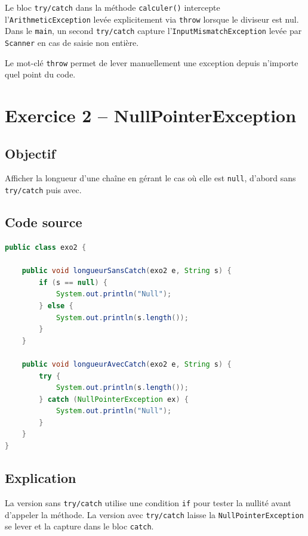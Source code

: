 Le bloc \texttt{try/catch} dans la méthode \texttt{calculer()} intercepte
l'\texttt{ArithmeticException} levée explicitement via \texttt{throw} lorsque
le diviseur est nul. Dans le \texttt{main}, un second \texttt{try/catch}
capture l'\texttt{InputMismatchException} levée par \texttt{Scanner} en cas de
saisie non entière.

\begin{infobox}
    \centering\vspace{0.2cm}
    {\large Le mot-clé \texttt{throw} permet de lever manuellement une exception
    depuis n'importe quel point du code.}
    \vspace{0.2cm}
\end{infobox}

\section{Exercice 2 -- NullPointerException}

\subsection{Objectif}

Afficher la longueur d'une chaîne en gérant le cas où elle est \texttt{null},
d'abord sans \texttt{try/catch} puis avec.

\subsection{Code source}

\begin{lstlisting}[language=Java, caption={exo2.java -- NullPointerException}]
public class exo2 {

    public void longueurSansCatch(exo2 e, String s) {
        if (s == null) {
            System.out.println("Null");
        } else {
            System.out.println(s.length());
        }
    }

    public void longueurAvecCatch(exo2 e, String s) {
        try {
            System.out.println(s.length());
        } catch (NullPointerException ex) {
            System.out.println("Null");
        }
    }
}
\end{lstlisting}

\subsection{Explication}

La version sans \texttt{try/catch} utilise une condition \texttt{if} pour
tester la nullité avant d'appeler la méthode. La version avec \texttt{try/catch}
laisse la \texttt{NullPointerException} se lever et la capture dans le bloc
\texttt{catch}.

